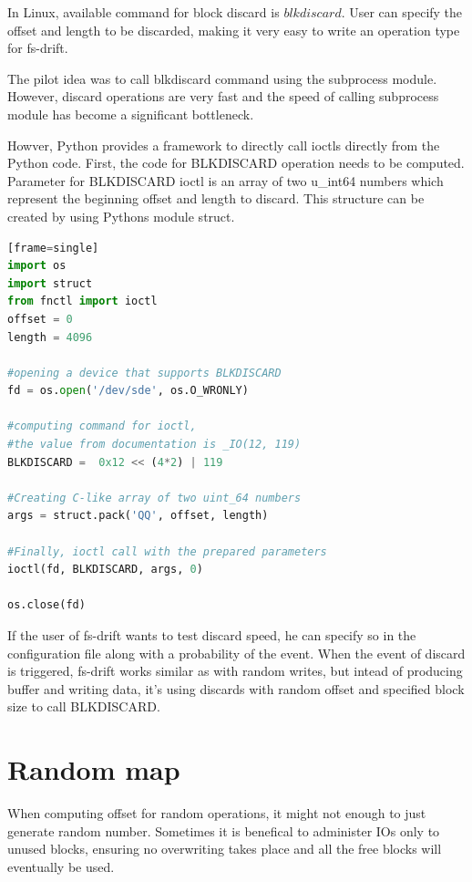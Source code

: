 \documentclass[
  color, %
  table, %
  lof,   %
  lot,   %
]{fithesis3}
\begin{document}
In Linux, available command for block discard is $blkdiscard$. User can specify the offset and length to be discarded, making it very easy to write an operation type for fs-drift.

The pilot idea was to call blkdiscard command using the subprocess module. However, discard operations are very fast and the speed of calling subprocess module has become a significant bottleneck.

Howver, Python provides a framework to directly call ioctls directly from the Python code. First, the code for BLKDISCARD operation needs to be computed. Parameter for BLKDISCARD ioctl is an array of two u\_int64 numbers which represent the beginning offset and length to discard. This structure can be created by using Pythons module struct.





\begin{lstlisting}[language=Python, caption={Using BLKDISCARD ioctl to discard first 4096 bytes from the beginning of the device},label={ex:blkdiscard}][frame=single]
import os
import struct
from fnctl import ioctl
offset = 0
length = 4096

#opening a device that supports BLKDISCARD
fd = os.open('/dev/sde', os.O_WRONLY)    

#computing command for ioctl,
#the value from documentation is _IO(12, 119)
BLKDISCARD =  0x12 << (4*2) | 119

#Creating C-like array of two uint_64 numbers
args = struct.pack('QQ', offset, length)

#Finally, ioctl call with the prepared parameters
ioctl(fd, BLKDISCARD, args, 0)

os.close(fd)
\end{lstlisting}


If the user of fs-drift wants to test discard speed, he can specify so in the configuration file along with a probability of the event. When the event of discard is triggered, fs-drift works similar as with random writes, but intead of producing buffer and writing data, it's using discards with random offset and specified block size to call BLKDISCARD.

\section{Random map}
When computing offset for random operations, it might not enough to just generate random number. Sometimes it is benefical to administer IOs only to unused blocks, ensuring no overwriting takes place and all the free blocks will eventually be used.
\end{document}
